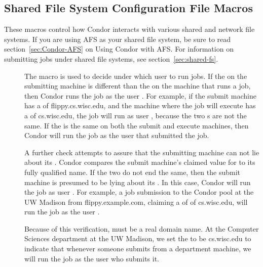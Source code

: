 \subsection{\label{sec:Shared-Filesystem-Config-File-Entries}Shared File System Configuration File Macros} 

These macros control how Condor interacts with various shared and
network file systems.  If you are using AFS as your shared file system,
be sure to read section~\ref{sec:Condor-AFS} on Using Condor with
AFS.
For information on submitting jobs under shared file systems,
see
section~\ref{sec:shared-fs}.
\begin{description}

\item[] \label{param:UidDomain}
  The  macro
  is used to decide under which user to run jobs.
  If the 
  on the submitting machine is different than
  the 
  on the machine that runs a job, then Condor runs
  the job as the user .
  For example, if the submit machine has
  a  of
  flippy.cs.wisc.edu, and the machine where the job will execute
  has a  of
  cs.wisc.edu, the job will run as user , because
  the two s are not the same.
  If the 
  is the same on both the submit and execute machines,
  then Condor will run the job as the user that submitted the job.

  A further check attempts to assure that the submitting
  machine can not lie about its .
  Condor compares the 
  submit machine's claimed value for 
  to its fully qualified name.
  If the two do not end the same, then the submit machine
  is presumed to be lying about its .
  In this case, Condor will run the job as user .
  For example, a job submission to the Condor pool at the UW Madison
  from flippy.example.com, claiming a  of
  of cs.wisc.edu,
  will run the job as the user .

  Because of this verification,
   must be a real domain name.
  At the Computer Sciences department
  at the UW Madison, we set the 
  to be cs.wisc.edu to
  indicate that whenever someone submits from a department machine, we
  will run the job as the user who submits it.


\end{description}
